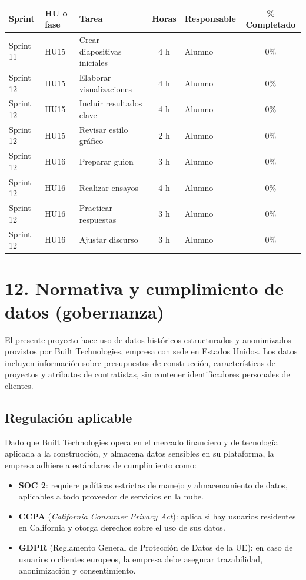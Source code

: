 \documentclass[
11pt, %
]{charter}
\begin{document}
\begin{table}[htpb]
\centering
\begin{tabularx}{\linewidth}{@{}|l|l|X|c|l|c|@{}}
\hline
\rowcolor[HTML]{C0C0C0}
Sprint & HU o fase & Tarea & Horas & Responsable & \% Completado \\ \hline

Sprint 11 & HU15 & Crear diapositivas iniciales & 4 h & Alumno & 0\% \\ \hline

Sprint 12 & HU15 & Elaborar visualizaciones & 4 h & Alumno & 0\% \\ \hline
Sprint 12 & HU15 & Incluir resultados clave & 4 h & Alumno & 0\% \\ \hline
Sprint 12 & HU15 & Revisar estilo gráfico & 2 h & Alumno & 0\% \\ \hline
Sprint 12 & HU16 & Preparar guion & 3 h & Alumno & 0\% \\ \hline
Sprint 12 & HU16 & Realizar ensayos & 4 h & Alumno & 0\% \\ \hline
Sprint 12 & HU16 & Practicar respuestas & 3 h & Alumno & 0\% \\ \hline
Sprint 12 & HU16 & Ajustar discurso & 3 h & Alumno & 0\% \\ \hline

\end{tabularx}
\end{table}

\section{12. Normativa y cumplimiento de datos (gobernanza)}

El presente proyecto hace uso de datos históricos estructurados y anonimizados provistos por Built Technologies, empresa con sede en Estados Unidos. Los datos incluyen información sobre presupuestos de construcción, características de proyectos y atributos de contratistas, sin contener identificadores personales de clientes.

\subsection*{Regulación aplicable}

Dado que Built Technologies opera en el mercado financiero y de tecnología aplicada a la construcción, y almacena datos sensibles en su plataforma, la empresa adhiere a estándares de cumplimiento como:

\begin{itemize}
    \item \textbf{SOC 2}: requiere políticas estrictas de manejo y almacenamiento de datos, aplicables a todo proveedor de servicios en la nube.
    \item \textbf{CCPA} (\textit{California Consumer Privacy Act}): aplica si hay usuarios residentes en California y otorga derechos sobre el uso de sus datos.
    \item \textbf{GDPR} (Reglamento General de Protección de Datos de la UE): en caso de usuarios o clientes europeos, la empresa debe asegurar trazabilidad, anonimización y consentimiento.
\end{itemize}
\end{document}
